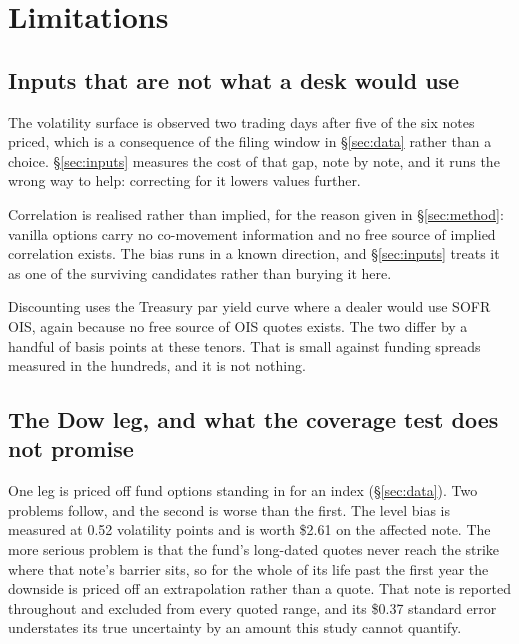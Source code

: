 \section{Limitations}\label{sec:limits}

\subsection{Inputs that are not what a desk would use}

The volatility surface is observed two trading days after five of the six notes
priced, which is a consequence of the filing window in \S\ref{sec:data} rather
than a choice. \S\ref{sec:inputs} measures the cost of that gap, note by note,
and it runs the wrong way to help: correcting for it lowers values further.

Correlation is realised rather than implied, for the reason given in
\S\ref{sec:method}: vanilla options carry no co-movement information and no free
source of implied correlation exists. The bias runs in a known direction, and
\S\ref{sec:inputs} treats it as one of the surviving candidates rather than
burying it here.

Discounting uses the Treasury par yield curve where a dealer would use SOFR
OIS, again because no free source of OIS quotes exists. The two differ by a
handful of basis points at these tenors. That is small against funding spreads
measured in the hundreds, and it is not nothing.

\subsection{The Dow leg, and what the coverage test does not promise}

One leg is priced off fund options standing in for an index
(\S\ref{sec:data}). Two problems follow, and the second is worse than the
first. The level bias is measured at 0.52 volatility points and is worth \$2.61
on the affected note. The more serious problem is that the fund's long-dated
quotes never reach the strike where that note's barrier sits, so for the whole
of its life past the first year the downside is priced off an extrapolation
rather than a quote. That note is reported throughout and excluded from every
quoted range, and its \$0.37 standard error understates its true uncertainty by
an amount this study cannot quantify.

